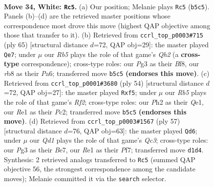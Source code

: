 \documentclass[11pt]{article}
\begin{document}
\clearpage

\begin{figure}[p]\centering
\begin{subfigure}{0.46\textwidth}\centering
\resizebox{\linewidth}{!}{%
\newchessgame
\chessboard[
  setfen={1rb2k2/1p2q2p/r2n4/1R4p1/N7/4P1P1/P4PKP/B2QR3 w - - 3 34},
  showmover=false,
  pgfstyle=straightmove, color=movearrow, markmove={b5-c5}
]}
\caption{}
\end{subfigure}\hfill
\begin{subfigure}{0.46\textwidth}\centering
\resizebox{\linewidth}{!}{%
\newchessgame
\chessboard[
  setfen={5bk1/1p5q/p6p/3p1Pp1/2nP4/2BQ3P/PPr1NRK1/8 b - - 0 33},
  showmover=false,
  pgfstyle=straightmove, color=movearrow, markmove={h7-e7}
]}
\caption{}
\end{subfigure}
\\[4pt]
\begin{subfigure}{0.46\textwidth}\centering
\resizebox{\linewidth}{!}{%
\newchessgame
\chessboard[
  setfen={3r2k1/2N2bp1/Rrn4p/2q2p2/3p4/4P1PP/2P2RBK/4Q3 w - - 0 28},
  showmover=false,
  pgfstyle=straightmove, color=movearrow, markmove={f2-f5}
]}
\caption{}
\end{subfigure}\hfill
\begin{subfigure}{0.46\textwidth}\centering
\resizebox{\linewidth}{!}{%
\newchessgame
\chessboard[
  setfen={r5k1/4bppp/1Nq5/3rp3/P5P1/1Pp1B3/K5QP/5B1R b - - 7 29},
  showmover=false,
  pgfstyle=straightmove, color=movearrow, markmove={c6-d6}
]}
\caption{}
\end{subfigure}
\caption{\textbf{Move 34, White: \texttt{Rc5}.} (a) Our position; Melanie plays \texttt{Rc5} (\texttt{b5c5}). Panels (b)--(d) are the retrieved master positions whose correspondence most drove this move (highest QAP objective among those that transfer to it). (b) Retrieved from \texttt{ccrl\_top\_p0003\#715} (ply 65) [structural distance $d$=72, QAP obj=29]: the master played \texttt{Qe7}; under $\mu$ our \emph{Rb5} plays the role of that game's \emph{Qh2} (a \textbf{cross-type} correspondence); cross-type roles: our \emph{P}g3 as their \emph{B}f8, our \emph{r}b8 as their \emph{P}a6; transferred move \texttt{b5c5} \textbf{(endorses this move)}. (c) Retrieved from \texttt{ccrl\_top\_p0001\#3680} (ply 54) [structural distance $d$=72, QAP obj=27]: the master played \texttt{Rxf5}; under $\mu$ our \emph{Rb5} plays the role of that game's \emph{Rf2}; cross-type roles: our \emph{P}h2 as their \emph{Q}e1, our \emph{R}e1 as their \emph{P}c2; transferred move \texttt{b5c5} \textbf{(endorses this move)}. (d) Retrieved from \texttt{ccrl\_top\_p0003\#1567} (ply 57) [structural distance $d$=76, QAP obj=63]: the master played \texttt{Qd6}; under $\mu$ our \emph{Qd1} plays the role of that game's \emph{Qc3}; cross-type roles: our \emph{P}g3 as their \emph{B}e7, our \emph{R}e1 as their \emph{P}f7; transferred move \texttt{d1d4}. Synthesis: 2 retrieved analogs transferred to \texttt{Rc5} (summed QAP objective 56, the strongest correspondence among the candidate moves); Melanie committed it via the \texttt{search} selector.}
\label{fig:thought-m66}
\end{figure}
\end{document}
